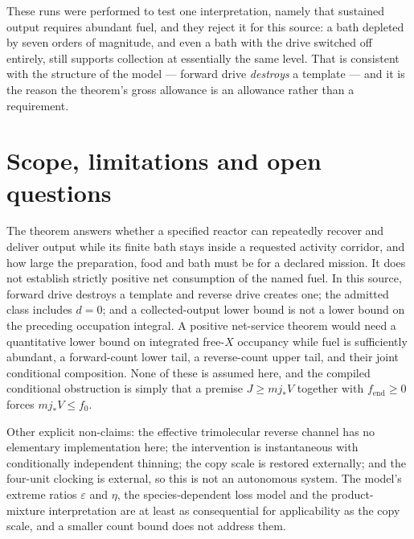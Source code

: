 \documentclass[11pt,a4paper]{article}
\theoremstyle{plain}
\theoremstyle{definition}
\theoremstyle{remark}
\newcommand{\eps}{\varepsilon}
\begin{document}
\begin{center}\small

\label{tab:diagnostics}
\end{center}

These runs were performed to test one interpretation, namely that sustained output requires abundant fuel, and they reject it for this source: a bath depleted by seven orders of magnitude, and even a bath with the drive switched off entirely, still supports collection at essentially the same level. That is consistent with the structure of the model --- forward drive \emph{destroys} a template --- and it is the reason the theorem's gross allowance is an allowance rather than a requirement.

\section{Scope, limitations and open questions}\label{sec:discussion}

The theorem answers whether a specified reactor can repeatedly recover and deliver output while its finite bath stays inside a requested activity corridor, and how large the preparation, food and bath must be for a declared mission. It does not establish strictly positive net consumption of the named fuel. In this source, forward drive destroys a template and reverse drive creates one; the admitted class includes $d=0$; and a collected-output lower bound is not a lower bound on the preceding occupation integral. A positive net-service theorem would need a quantitative lower bound on integrated free-$X$ occupancy while fuel is sufficiently abundant, a forward-count lower tail, a reverse-count upper tail, and their joint conditional composition. None of these is assumed here, and the compiled conditional obstruction is simply that a premise $J\ge mj_\ast V$ together with $f_{\mathrm{end}}\ge0$ forces $mj_\ast V\le f_0$.

Other explicit non-claims: the effective trimolecular reverse channel has no elementary implementation here; the intervention is instantaneous with conditionally independent thinning; the copy scale is restored externally; and the four-unit clocking is external, so this is not an autonomous system. The model's extreme ratios $\eps$ and $\eta$, the species-dependent loss model and the product-mixture interpretation are at least as consequential for applicability as the copy scale, and a smaller count bound does not address them.
\end{document}
